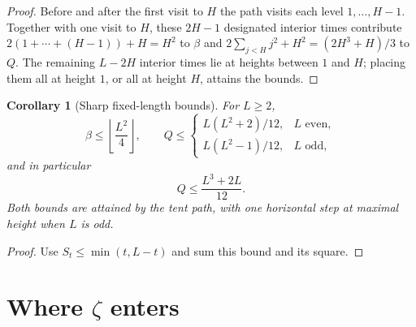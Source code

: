 \documentclass[11pt]{amsart}
\numberwithin{equation}{section}
\theoremstyle{plain}
\newtheorem{corollary}[theorem]{Corollary}
\theoremstyle{definition}
\theoremstyle{remark}
\begin{document}
\begin{proof}
Before and after the first visit to $H$ the path visits each level
$1,\dots,H-1$. Together with one visit to $H$, these $2H-1$ designated
interior times contribute $2(1+\cdots+(H-1))+H=H^2$ to $\beta$ and
$2\sum_{j<H}j^2+H^2=(2H^3+H)/3$ to $Q$. The remaining $L-2H$ interior times
lie at heights between $1$ and $H$; placing them all at height $1$, or all
at height $H$, attains the bounds.
\end{proof}

\begin{corollary}[Sharp fixed-length bounds]
\label{cor:fixed-L}
For $L\ge2$,
\[
\beta\le\left\lfloor\frac{L^2}{4}\right\rfloor,\qquad
Q\le
\begin{cases}
L(L^2+2)/12,&L\text{ even},\\
L(L^2-1)/12,&L\text{ odd},
\end{cases}
\]
and in particular
\begin{equation}
\label{eq:Q_upper}
Q\le\frac{L^3+2L}{12}.
\end{equation}
Both bounds are attained by the tent path, with one horizontal step at
maximal height when $L$ is odd.
\end{corollary}

\begin{proof}
Use $S_t\le\min(t,L-t)$ and sum this bound and its square.
\end{proof}

\section{Where \texorpdfstring{$\zeta$}{zeta} enters}
\label{sec:zeta}
\end{document}
